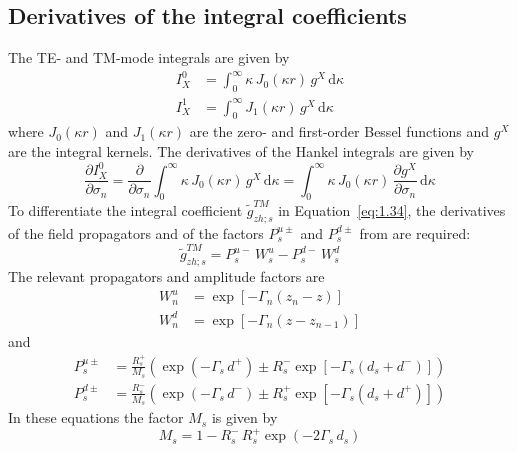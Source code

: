 \documentclass[12pt]{report}
\begin{document}
\subsection{Derivatives of the integral coefficients}
\label{sec:integral_coeff}

The TE- and TM-mode integrals are given by
\begin{align}
    I^0_X &= \int_0^{\infty} \kappa\,J_0(\kappa r)\,g^X\,\mathrm{d}\kappa
    \label{eq:1.38} \\
    I^1_X &= \int_0^{\infty} J_1(\kappa r)\,g^X\,\mathrm{d}\kappa
    \label{eq:1.39}
\end{align}
where \(J_0(\kappa r)\) and \(J_1(\kappa r)\) are the zero- and
first-order Bessel functions and \(g^X\) are the integral kernels. The
derivatives of the Hankel integrals are given by
\begin{equation}
    \frac{\partial I^0_X}{\partial \sigma_n}
    = \frac{\partial}{\partial \sigma_n}\int_0^{\infty}\kappa\,J_0(\kappa r)\,g^X\,\mathrm{d}\kappa
    = \int_0^{\infty}\kappa\,J_0(\kappa r)\,\frac{\partial g^X}{\partial \sigma_n}\,\mathrm{d}\kappa
    \label{eq:1.40}
\end{equation}
To differentiate the integral coefficient
\(\tilde g^{TM}_{zh;s}\) in Equation~\eqref{eq:1.34}, the derivatives of
the field propagators and of the factors \(P_s^{u\pm}\) and
\(P_s^{d\pm}\) from  are required:
\begin{equation}
    \tilde{g}^{TM}_{zh;s} = P_s^{u-}\,W_s^u - P_s^{d-}\,W_s^d
    \label{eq:1.41}
\end{equation}
The relevant propagators and amplitude factors are
\begin{align}
    W_n^u &= \exp\!\left[-\Gamma_n(z_n - z)\right] \label{eq:1.42} \\
    W_n^d &= \exp\!\left[-\Gamma_n(z - z_{n-1})\right] \label{eq:1.43}
\end{align}
and
\begin{align}
    P_s^{u\pm} &= \frac{R_s^+}{M_s}
        \left(\exp(-\Gamma_s\,d^+) \pm R_s^-\exp\!\left[-\Gamma_s(d_s+d^-)\right]\right)
    \label{eq:1.44} \\
    P_s^{d\pm} &= \frac{R_s^-}{M_s}
        \left(\exp(-\Gamma_s\,d^-) \pm R_s^+\exp\!\left[-\Gamma_s(d_s+d^+)\right]\right)
    \label{eq:1.45}
\end{align}
In these equations the factor \(M_s\) is given by
\begin{equation}
    M_s = 1 - R_s^-\,R_s^+\exp(-2\Gamma_s\,d_s)
    \label{eq:1.46}
\end{equation}
\end{document}
